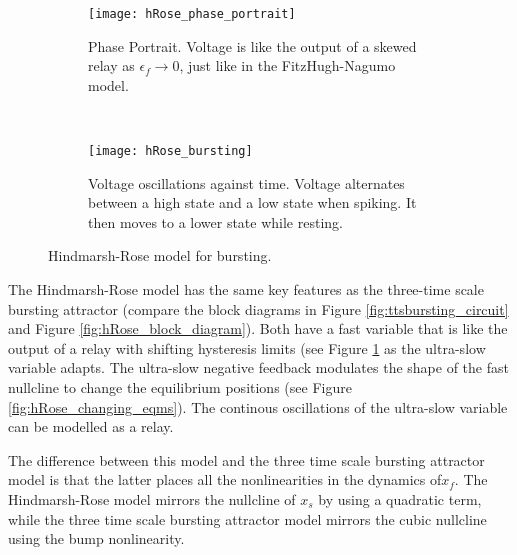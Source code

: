 \documentclass[a4paper, 12pt]{article}
\begin{document}
\begin{figure}[h!]
    \centering
    \begin{subfigure}[t]{0.48\textwidth}
        \texttt{[image: hRose\_phase\_portrait]}
        \caption{Phase Portrait. Voltage is like the output of a skewed relay as $\epsilon_f\rightarrow0$, just like in the FitzHugh-Nagumo model.}
        \label{fig:hRose_phase_portrait}
    \end{subfigure}
    ~ %
    \begin{subfigure}[t]{0.48\textwidth}
        \texttt{[image: hRose\_bursting]}
        \caption{Voltage oscillations against time. Voltage alternates between a high state and a low state when spiking. It then moves to a lower state while resting.}
        \label{fig:hRose_voltage_time}
    \end{subfigure}
\caption{Hindmarsh-Rose model for bursting.}
\label{fig:hRose_bursting}
\end{figure}

The Hindmarsh-Rose model has the same key features as the three-time scale bursting attractor (compare the block diagrams in Figure \ref{fig:ttsbursting_circuit} and Figure \ref{fig:hRose_block_diagram}). Both have a fast variable that is like the output of a relay with shifting hysteresis limits (see Figure \ref{fig:hRose_phase_portrait} as the ultra-slow variable adapts. The ultra-slow negative feedback modulates the shape of the fast nullcline to change the equilibrium positions (see Figure \ref{fig:hRose_changing_eqms}). The continous oscillations of the ultra-slow variable can be modelled as a relay.  

The difference between this model and the three time scale bursting attractor model is that the latter places all the nonlinearities in the dynamics of$x_f$. The Hindmarsh-Rose model mirrors the nullcline of $x_s$ by using a quadratic term, while the three time scale bursting attractor model mirrors the cubic nullcline using the bump nonlinearity. 
\end{document}
